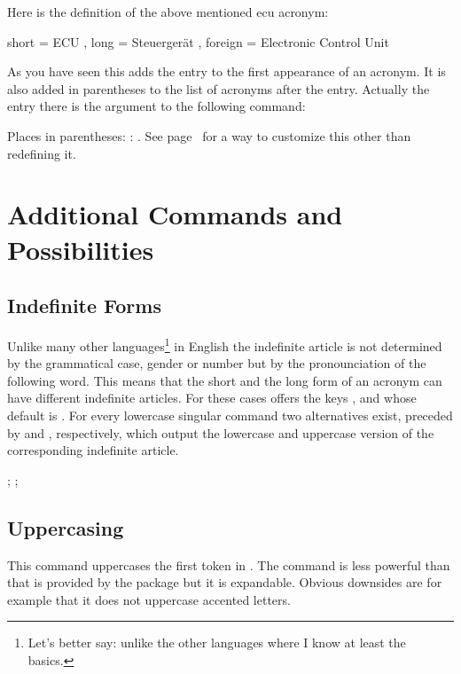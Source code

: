 \documentclass[DIV10,toc=index,toc=bib,hyperfootnotes=false]{cnpkgdoc}
\begin{document}
Here is the definition of the above mentioned \ac{ecu} acronym:
\begin{beispiel}
   {
     short   = ECU ,
     long    = Steuergerät ,
     foreign = Electronic Control Unit
   }
\end{beispiel}
As you have seen this adds the  entry to the first appearance of
an acronym. It is also added in parentheses to the list of acronyms after the
 entry. Actually the entry there is the argument to the following
command:
\begin{beschreibung}
 \newline
   Places  in parentheses: :
   . See page~\pageref{key:list-foreign-format} for a way
   to customize this other than redefining it.
\end{beschreibung}

\section{Additional Commands and Possibilities}
\subsection{Indefinite Forms}
\noindent{}%
Unlike many other languages\footnote{Let's better say: unlike the other
languages where I know at least the basics.} in English the indefinite article
is not determined by the grammatical case, gender or number but by the
pronounciation of the following word. This means that the short and the long
form of an acronym can have different indefinite articles. For these cases \acro
offers the keys ,  and
 whose default is . For every lowercase singular
command two alternatives exist, preceded by  and , respectively,
which output the lowercase and uppercase version of the corresponding indefinite
article.

\begin{beispiel}
 ; ; 
\end{beispiel}

\subsection{Uppercasing}
\begin{beschreibung}
  \newline
    This command uppercases the first token in .  The command is less powerful than  that is
    provided by the  package but it is expandable.  Obvious
    downsides are for example that it does not uppercase accented letters.
\end{beschreibung}
\end{document}
